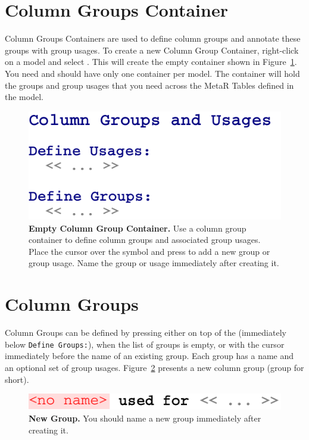 \section{Column Groups Container}\label{sec:ColumnGroupContainer}
Column Groups Containers are used to define column groups and annotate these groups with group usages.
To create a new Column Group Container, right-click on a model and select . This will create the empty container shown in Figure~\ref{fig:NewColumnGroupContainer}. You need and should have only one container per model. The container will hold the groups and group usages that you need across the MetaR Tables defined in the model.
\begin{figure}
  \centering
  \includegraphics[width=\figWidthNarrow]{figures/NewColumnGroupContainer.pdf}
\caption[Empty Column Group Container.]{\textbf{Empty Column Group Container.} Use a column group container to define column groups and associated group usages. Place the cursor over the \mpsplaceholder{} symbol and press \keys{\return} to add a new group or group usage. Name the group or usage immediately after creating it.}
\label{fig:NewColumnGroupContainer}
\end{figure}

\section{Column Groups}\label{sec:ColumnGroups}
Column Groups can be defined by pressing \keys{\return} either on top of the \mpsplaceholder{} (immediately below \texttt{Define Groups:}), when the list of groups is empty, or with the cursor immediately before the name of an existing group. Each group has a name and an optional set of group usages. Figure~\ref{fig:NewGroup} presents a new column group (group for short).

\begin{figure}
  \centering
  \includegraphics[width=\figWidthNarrow]{figures/NewGroup.pdf}
\caption[New Group.]{\textbf{New Group.} You should name a new group immediately after creating it.}
\label{fig:NewGroup}
\end{figure}

